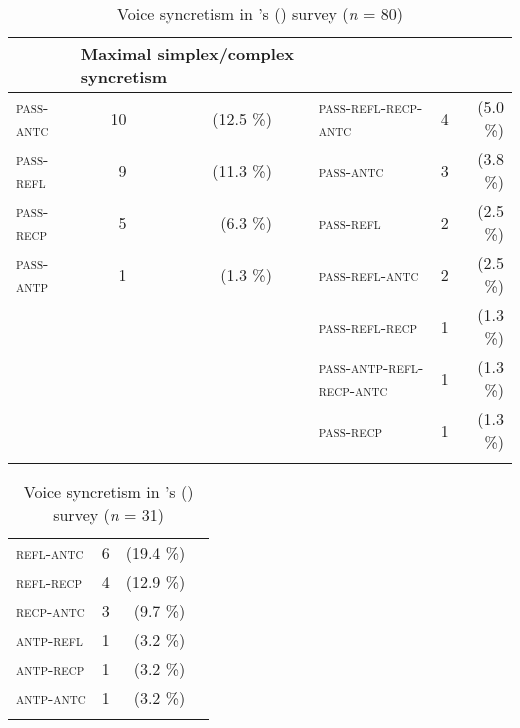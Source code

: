 \begin{table}
	\begin{tabularx}{.94\textwidth}{lrrrlrr}
		\lsptoprule
		\multicolumn{4}{l}{Minimal simplex syncretism} & \multicolumn{3}{l}{Maximal simplex/complex syncretism} \\
		\midrule
		\textsc{pass-antc} & 10 & (12.5 \%) & & \textsc{pass-refl-recp-antc} & 4 & (5.0 \%) \\
		\textsc{pass-refl} &  9 & (11.3 \%) & & \textsc{pass-antc} & 3 & (3.8 \%) \\
		\textsc{pass-recp} &  5 &  (6.3 \%) & & \textsc{pass-refl} & 2 & (2.5 \%) \\
		\textsc{pass-antp} &  1 &  (1.3 \%) & & \textsc{pass-refl-antc} & 2 & (2.5 \%) \\
		& & & & \textsc{pass-refl-recp} & 1 & (1.3 \%) \\
		& & & & \textsc{pass-antp-refl-recp-antc} & 1 & (1.3 \%) \\
		& & & & \textsc{pass-recp} & 1 & (1.3 \%) \\
		\lspbottomrule
	\end{tabularx}
	\caption{Voice syncretism in \citeauthor{haspelmath:1990}’s (\citeyear{haspelmath:1990}) survey (\textit{n} = 80)}
	\label{tab:ch3:haspelmath-patterns-1}
\end{table} 

\begin{table}
	\begin{tabularx}{.40\textwidth}{lrrr}
		\lsptoprule
		\multicolumn{4}{l}{Minimal simplex syncretism} \\
		\midrule
		\textsc{refl-antc} & 6 & (19.4 \%) & \\
		\textsc{refl-recp} & 4 & (12.9 \%) & \\
		\textsc{recp-antc} & 3 &  (9.7 \%) & \\
		\textsc{antp-refl} & 1 &  (3.2 \%) & \\
		\textsc{antp-recp} & 1 &  (3.2 \%) & \\
		\textsc{antp-antc} & 1 &  (3.2 \%) & \\
		\lspbottomrule
	\end{tabularx}
	\caption{Voice syncretism in \citeauthor{haspelmath:1990}’s (\citeyear{haspelmath:1990}) survey (\textit{n} = 31)}
	\label{tab:ch3:haspelmath-patterns-2}
\end{table} 

